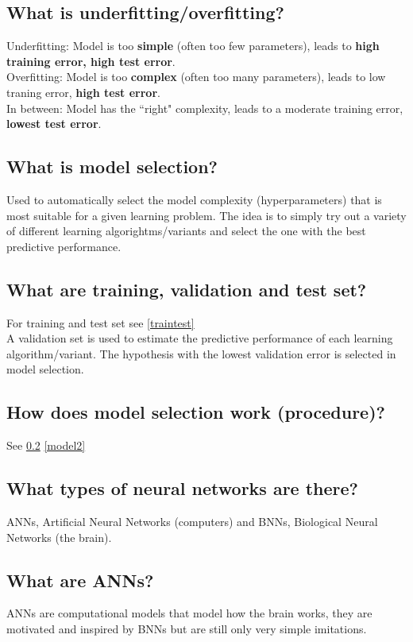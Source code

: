 \documentclass[12pt]{scrartcl}
\begin{document}
\subsection{What is underfitting/overfitting?}
Underfitting: Model is too {\bf simple} (often too few parameters), leads to {\bf high training error, high test error}. \\
Overfitting: Model is too {\bf complex} (often too many parameters), leads to low traning error, {\bf high test error}. \\
In between: Model has the ``right" complexity, leads to a moderate training error, {\bf lowest test error}.

\subsection{What is model selection?}
\label{model1}Used to automatically select the model complexity (hyperparameters) that is most suitable for a given learning problem. The idea is to simply try out a variety of different learning algorightms/variants and select the one with the best predictive performance.

\subsection{What are training, validation and test set?}
For training and test set see \ref{traintest} \\
\label{model2}A validation set is used to estimate the predictive performance of each learning algorithm/variant. The hypothesis with the lowest validation error is selected in model selection.

\subsection{How does model selection work (procedure)?}
See \ref{model1} \ref{model2}

\subsection{What types of neural networks are there?}
ANNs, Artificial Neural Networks (computers) and BNNs, Biological Neural Networks (the brain).

\subsection{What are ANNs?}
ANNs are computational models that model how the brain works, they are motivated and inspired by BNNs but are still only very simple imitations.
\end{document}
